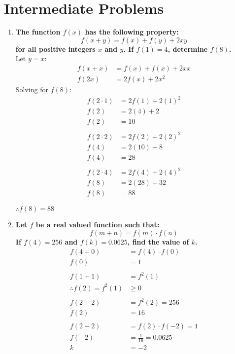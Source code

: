\documentclass[12pt]{article}
\begin{document}
\section*{Intermediate Problems}
\begin{enumerate}
    \item \textbf{The function $f(x)$ has the following property: $$f(x+y)=f(x)+f(y)+2xy$$ for all positive integers $x$ and $y$. If $f(1)=4$, determine $f(8)$.} \\
    
    Let $y = x$:
    \begin{align*}
        f(x + x) &= f(x) + f(x) + 2xx \\
        f(2x) &= 2f(x) + 2x^2
    \end{align*}
    Solving for $f(8)$:
    \begin{align*}
        f(2 \cdot 1) &= 2f(1) + 2(1)^2 \\
        f(2) &= 2(4) + 2 \\
        f(2) & = 10 \\ \\
        f(2 \cdot 2) &= 2f(2) + 2(2)^2 \\
        f(4) &= 2(10) + 8 \\
        f(4) & = 28 \\ \\
        f(2 \cdot 4) &= 2f(4) + 2(4)^2 \\
        f(8) &= 2(28) + 32 \\
        f(8) & = 88
    \end{align*}
    
    $\therefore f(8) = 88$

    \item \textbf{Let $f$ be a real valued function such that: $$f(m + n) = f(m)\cdot f(n)$$ If $f(4) = 256$ and $f(k) = 0.0625$, find the value of $k$.}
    \begin{align*}
        f(4+0)&=f(4)\cdot f(0) \\
        f(0)&=1 \\ \\
        f(1+1)&=f^2(1) \\
        \therefore f(2) = f^2(1) & \geq 0 \\ \\
        f(2+2)&=f^2(2)=256 \\
        f(2)&=16 \\ \\
        f(2-2)&=f(2)\cdot f(-2)=1 \\
        f(-2)&=\frac{1}{16}=0.0625 \\
        k&=-2
    \end{align*}
    
\end{enumerate}
\end{document}
